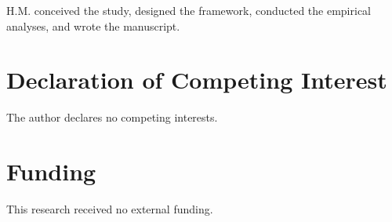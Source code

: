 \documentclass[review,authoryear]{elsarticle}
\theoremstyle{definition}
\begin{document}
H.M. conceived the study, designed the framework, conducted the empirical analyses, and wrote the manuscript.

\section*{Declaration of Competing Interest}

The author declares no competing interests.

\section*{Funding}

This research received no external funding.



\end{document}
